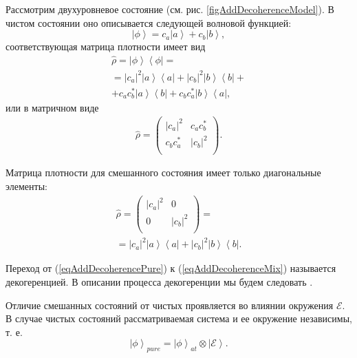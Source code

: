 Рассмотрим двухуровневое состояние
(см. рис. \ref{figAddDecoherenceModel}). В чистом состоянии оно
описывается 
следующей волновой функцией:
\begin{equation}
\left|\phi\right> = c_a \left|a \right> + c_b \left|b\right>,
\nonumber
\end{equation}
соответствующая матрица плотности имеет вид
\begin{eqnarray}
\hat{\rho} = \left|\phi\right>\left<\phi\right| =
\nonumber \\
= 
\left|c_a\right|^2 \left|a\right>\left<a\right| + 
\left|c_b\right|^2 \left|b\right>\left<b\right| +
\nonumber \\
+
c_a c_b^{\ast}\left|a\right>\left<b\right| +
c_b c_a^{\ast}\left|b\right>\left<a\right|,
\label{eqAddDecoherencePure}
\end{eqnarray}
или в матричном виде
\begin{eqnarray}
\hat{\rho} = 
\begin{pmatrix}
\left|c_a\right|^2 & c_a c_b^{\ast} \\
c_b c_a^{\ast} & \left|c_b\right|^2 \\
\end{pmatrix}.
\nonumber
\end{eqnarray}

Матрица плотности для смешанного состояния имеет только диагональные
элементы:
\begin{eqnarray}
\hat{\rho} = 
\begin{pmatrix}
\left|c_a\right|^2 & 0 \\
0 & \left|c_b\right|^2 \\
\end{pmatrix} = 
\nonumber \\
=
\left|c_a\right|^2 \left|a\right>\left<a\right| + 
\left|c_b\right|^2 \left|b\right>\left<b\right|.
\label{eqAddDecoherenceMix}
\end{eqnarray}



Переход от (\ref{eqAddDecoherencePure}) к (\ref{eqAddDecoherenceMix})
называется декогеренцией. В описании процесса декогеренции мы будем следовать
 \cite{bMensky2001}. 

Отличие смешанных состояний от чистых проявляется во влиянии окружения
$\mathcal{E}$. В случае чистых состояний рассматриваемая система и ее
окружение независимы, т. е.
\begin{equation}
\left|\phi\right>_{pure} = \left|\phi\right>_{at} \otimes
\left|\mathcal{E}\right>.
\label{eqAddDecoherencePhiPure}
\end{equation}


